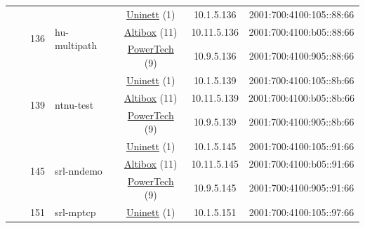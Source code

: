 \begin{small}
\begin{center}
\begin{longtable}{|c|c|c|c|c|c|c|c|}
  &  & \multirow{3}{*}{\tiny{136}} & \multicolumn{1}{|l|}{\multirow{3}{*}{\tiny{hu-multipath}}} & \multicolumn{2}{|c|}{\tiny{\href{https://www.uninett.no}{Uninett} (1)}} & \tiny{10.1.5.136} & \tiny{2001:700:4100:105::88:66} \\* \cline{5-5}\cline{6-6}\cline{7-7}\cline{8-8}
  &  &  &  & \multicolumn{2}{|c|}{\tiny{\href{https://www.altibox.no}{Altibox} (11)}} & \tiny{10.11.5.136} & \tiny{2001:700:4100:b05::88:66} \\* \cline{5-5}\cline{6-6}\cline{7-7}\cline{8-8}
  &  &  &  & \multicolumn{2}{|c|}{\tiny{\href{http://www.powertech.no}{PowerTech} (9)}} & \tiny{10.9.5.136} & \tiny{2001:700:4100:905::88:66} \\* \cline{3-3}\cline{4-4}\cline{5-5}\cline{6-6}\cline{7-7}\cline{8-8}
  &  & \multirow{3}{*}{\tiny{139}} & \multicolumn{1}{|l|}{\multirow{3}{*}{\tiny{ntnu-test}}} & \multicolumn{2}{|c|}{\tiny{\href{https://www.uninett.no}{Uninett} (1)}} & \tiny{10.1.5.139} & \tiny{2001:700:4100:105::8b:66} \\* \cline{5-5}\cline{6-6}\cline{7-7}\cline{8-8}
  &  &  &  & \multicolumn{2}{|c|}{\tiny{\href{https://www.altibox.no}{Altibox} (11)}} & \tiny{10.11.5.139} & \tiny{2001:700:4100:b05::8b:66} \\* \cline{5-5}\cline{6-6}\cline{7-7}\cline{8-8}
  &  &  &  & \multicolumn{2}{|c|}{\tiny{\href{http://www.powertech.no}{PowerTech} (9)}} & \tiny{10.9.5.139} & \tiny{2001:700:4100:905::8b:66} \\* \cline{3-3}\cline{4-4}\cline{5-5}\cline{6-6}\cline{7-7}\cline{8-8}
  &  & \multirow{3}{*}{\tiny{145}} & \multicolumn{1}{|l|}{\multirow{3}{*}{\tiny{srl-nndemo}}} & \multicolumn{2}{|c|}{\tiny{\href{https://www.uninett.no}{Uninett} (1)}} & \tiny{10.1.5.145} & \tiny{2001:700:4100:105::91:66} \\* \cline{5-5}\cline{6-6}\cline{7-7}\cline{8-8}
  &  &  &  & \multicolumn{2}{|c|}{\tiny{\href{https://www.altibox.no}{Altibox} (11)}} & \tiny{10.11.5.145} & \tiny{2001:700:4100:b05::91:66} \\* \cline{5-5}\cline{6-6}\cline{7-7}\cline{8-8}
  &  &  &  & \multicolumn{2}{|c|}{\tiny{\href{http://www.powertech.no}{PowerTech} (9)}} & \tiny{10.9.5.145} & \tiny{2001:700:4100:905::91:66} \\* \cline{3-3}\cline{4-4}\cline{5-5}\cline{6-6}\cline{7-7}\cline{8-8}
  &  & \multirow{3}{*}{\tiny{151}} & \multicolumn{1}{|l|}{\multirow{3}{*}{\tiny{srl-mptcp}}} & \multicolumn{2}{|c|}{\tiny{\href{https://www.uninett.no}{Uninett} (1)}} & \tiny{10.1.5.151} & \tiny{2001:700:4100:105::97:66} \\* \cline{5-5}\cline{6-6}\cline{7-7}\cline{8-8}

\end{longtable}
\end{center}
\end{small}
